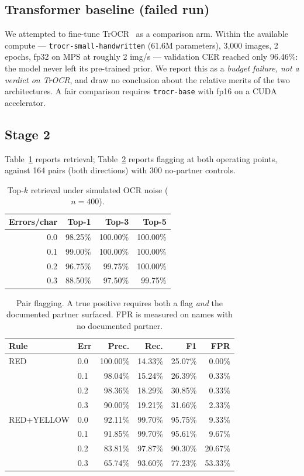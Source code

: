 \documentclass[conference]{IEEEtran}
\begin{document}
\subsection{Transformer baseline (failed run)}
We attempted to fine-tune TrOCR~\cite{li2023trocr} as a comparison arm. Within
the available compute --- \texttt{trocr-small-handwritten} (61.6M parameters),
3{,}000 images, 2 epochs, fp32 on MPS at roughly 2 img/s --- validation CER
reached only 96.46\%: the model never left its pre-trained prior. We report this
as a \emph{budget failure, not a verdict on TrOCR}, and draw no conclusion about
the relative merits of the two architectures. A fair comparison requires
\texttt{trocr-base} with fp16 on a CUDA accelerator.

\subsection{Stage 2}
Table~\ref{tab:retrieval} reports retrieval; Table~\ref{tab:flagging} reports
flagging at both operating points, against 164 pairs (both directions) with 300
no-partner controls.

\begin{table}[t]
\caption{Top-$k$ retrieval under simulated OCR noise ($n=400$).}
\label{tab:retrieval}
\centering
\begin{tabular}{@{}rrrr@{}}
\toprule
Errors/char & Top-1 & Top-3 & Top-5 \\
\midrule
0.0 & 98.25\% & 100.00\% & 100.00\% \\
0.1 & 99.00\% & 100.00\% & 100.00\% \\
0.2 & 96.75\% & 99.75\%  & 100.00\% \\
0.3 & 88.50\% & 97.50\%  & 99.75\%  \\
\bottomrule
\end{tabular}
\end{table}

\begin{table}[t]
\caption{Pair flagging. A true positive requires both a flag \emph{and} the
documented partner surfaced. FPR is measured on names with no documented partner.}
\label{tab:flagging}
\centering
\footnotesize
\begin{tabular}{@{}llrrrr@{}}
\toprule
Rule & Err & Prec. & Rec. & F1 & FPR \\
\midrule
RED
 & 0.0 & 100.00\% & 14.33\% & 25.07\% & 0.00\% \\
 & 0.1 & 98.04\%  & 15.24\% & 26.39\% & 0.33\% \\
 & 0.2 & 98.36\%  & 18.29\% & 30.85\% & 0.33\% \\
 & 0.3 & 90.00\%  & 19.21\% & 31.66\% & 2.33\% \\
\midrule
RED+YELLOW
 & 0.0 & 92.11\% & 99.70\% & 95.75\% & 9.33\%  \\
 & 0.1 & 91.85\% & 99.70\% & 95.61\% & 9.67\%  \\
 & 0.2 & 83.81\% & 97.87\% & 90.30\% & 20.67\% \\
 & 0.3 & 65.74\% & 93.60\% & 77.23\% & 53.33\% \\
\bottomrule
\end{tabular}
\end{table}
\end{document}
